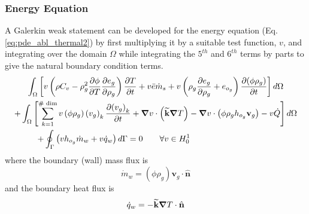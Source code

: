 \subsubsection{Energy Equation}
A Galerkin weak statement can be developed for the energy equation (Eq. \ref{eq:pde_abl_thermal2}) by first multiplying it by a suitable test function, $v$,
and integrating over the domain $\Omega$ while integrating the $\text{5}^{th}$ and $\text{6}^{th}$ terms by parts to give the natural boundary condition terms.
\begin{multline}
  \int_{\Omega} \left[ v \left( \rho C_{v} - \rho_{g}^{2} \pdv{\phi}{T}\pdv{e_{g}}{\rho_{g}}\right)\pdv{T}{t} + v \bar{e} \dot{m}_{s} + v \left(\rho_{g} \pdv{e_{g}}{\rho_{g}} + e_{o_{g}}\right) \pdv{\left( \phi \rho_{g} \right)}{t} \right] d\Omega 
\\ + \int_{\Omega} \left[ \sum_{k=1}^{\text{\# dim}} v \left( \phi \rho_{g} \right) \left(v_{g}\right)_{k} \pdv{\left(v_{g}\right)_{k}}{t} + \grad{v} \cdot \left(\widetilde{\textbf{k}}  \grad{T} \right) - \grad{v} \cdot \left( \phi \rho_{g} h_{o_{g}} \mathbf{v}_g \right) - v\dot{Q} \right] d \Omega 
\\ + \oint_{\Gamma} \left(  v h_{o_{g}} \dot{m}_{w} + v \dot{q}_{w} \right) d \Gamma = 0 \hspace{2eM} \forall v \in H_0^1 \hspace{10eM}
 \label{eq:pde_abl_thermal_galerkin}
\end{multline}
where the boundary (wall) mass flux is
\begin{equation}
  \dot{m}_{w} = \left( \phi \rho_{g} \right) \mathbf{v}_{g} \cdot \hat{\textbf{n}}
\end{equation}
and the boundary heat flux is
\begin{equation}
  \dot{q}_{w} = - \widetilde{\textbf{k}} {\boldsymbol{\nabla}} {T} \cdot \hat{\textbf{n}}
\end{equation}
